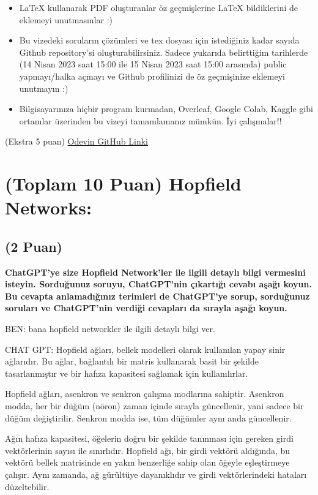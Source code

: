 \documentclass[11pt]{article}
\begin{document}
\begin{itemize}
    \item LaTeX kullanarak PDF oluşturanlar öz geçmişlerine LaTeX bildiklerini de eklemeyi unutmasınlar :)
    \item Bu vizedeki soruların çözümleri ve tex dosyası için istediğiniz kadar sayıda Github repository'si oluşturabilirsiniz. Sadece yukarıda belirttiğim tarihlerde (14 Nisan 2023 saat 15:00 ile 15 Nisan 2023 saat 15:00 arasında) public yapmayı/halka açmayı ve Github profilinizi de öz geçmişinize eklemeyi unutmayın :)
    \item Bilgisayarınıza hiçbir program kurmadan, Overleaf, Google Colab, Kaggle gibi ortamlar üzerinden bu vizeyi tamamlamanız mümkün. İyi çalışmalar!!
\end{itemize}

(Ekstra 5 puan) \href{https://github.com/ilkay-bicici/yapaysiniraglariornekler.git}{Odevin GitHub Linki}

\newpage
\section{(Toplam 10 Puan) Hopfield Networks:}

\subsection{(2 Puan)} \textbf{ChatGPT’ye size Hopfield Network’ler ile ilgili detaylı bilgi vermesini isteyin. Sorduğunuz soruyu, ChatGPT'nin çıkartığı cevabı aşağı koyun. Bu cevapta anlamadığınız terimleri de ChatGPT’ye sorup, sorduğunuz soruları ve ChatGPT’nin verdiği cevapları da sırayla aşağı koyun.}


BEN: bana hopfield networkler ile ilgili detaylı bilgi ver.

CHAT GPT: Hopfield ağları, bellek modelleri olarak kullanılan yapay sinir ağlarıdır. Bu ağlar, bağlantılı bir matris kullanarak basit bir şekilde tasarlanmıştır ve bir hafıza kapasitesi sağlamak için kullanılırlar.

Hopfield ağları, asenkron ve senkron çalışma modlarına sahiptir. Asenkron modda, her bir düğüm (nöron) zaman içinde sırayla güncellenir, yani sadece bir düğüm değiştirilir. Senkron modda ise, tüm düğümler aynı anda güncellenir.

Ağın hafıza kapasitesi, öğelerin doğru bir şekilde tanınması için gereken girdi vektörlerinin sayısı ile sınırlıdır. Hopfield ağı, bir girdi vektörü aldığında, bu vektörü bellek matrisinde en yakın benzerliğe sahip olan öğeyle eşleştirmeye çalışır. Aynı zamanda, ağ gürültüye dayanıklıdır ve girdi vektörlerindeki hataları düzeltebilir.
\end{document}
